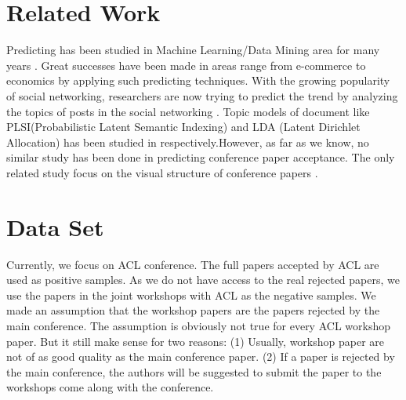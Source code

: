 \documentclass[11pt,letterpaper]{article}
\begin{document}
\section{Related Work}

Predicting has been studied in Machine Learning/Data Mining area for many years \cite{Bing}. Great successes have been made in areas range from e-commerce to economics by applying such predicting techniques. With the growing popularity of social networking, researchers are now trying to predict the trend by analyzing the topics of posts in the social networking \cite{Twitter}. Topic models of document like PLSI(Probabilistic Latent Semantic Indexing) and LDA (Latent Dirichlet Allocation) has been studied in \cite{Hofmann,Blei}  respectively.However, as far as we know, no similar study has been done in predicting conference paper acceptance. The only related study focus on the visual structure of conference papers \cite{Carven}. 













\section{Data Set}
Currently, we focus on ACL conference.
The full papers accepted by ACL are used as positive samples. 
As we do not have access to the real rejected papers, 
we use the papers in the joint workshops with ACL as the negative samples.
We made an assumption that the workshop papers are the papers rejected by the main conference.
The assumption is obviously not true for every ACL workshop paper.
But it still make sense for two reasons:
(1) Usually, workshop paper are not of as good quality as the main conference paper. 
(2) If a paper is rejected by the main conference, the authors will be suggested to submit the paper to the workshops come along with the conference.
\end{document}
